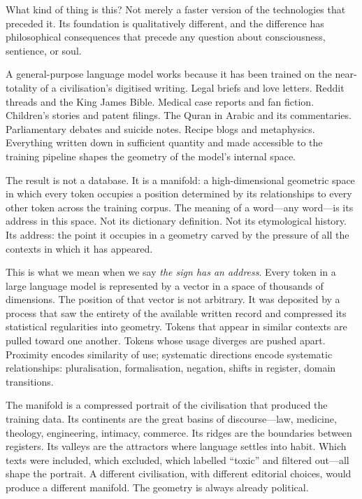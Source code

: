 What kind of thing is this? Not merely a faster version of the technologies that preceded it. Its foundation is qualitatively different, and the difference has philosophical consequences that precede any question about consciousness, sentience, or soul.

A general-purpose language model works because it has been trained on the near-totality of a civilisation's digitised writing. Legal briefs and love letters. Reddit threads and the King James Bible. Medical case reports and fan fiction. Children's stories and patent filings. The Quran in Arabic and its commentaries. Parliamentary debates and suicide notes. Recipe blogs and metaphysics. Everything written down in sufficient quantity and made accessible to the training pipeline shapes the geometry of the model's internal space.

The result is not a database. It is a manifold: a high-dimensional geometric space in which every token occupies a position determined by its relationships to every other token across the training corpus. The meaning of a word---any word---is its address in this space. Not its dictionary definition. Not its etymological history. Its address: the point it occupies in a geometry carved by the pressure of all the contexts in which it has appeared.

This is what we mean when we say \textit{the sign has an address}. Every token in a large language model is represented by a vector in a space of thousands of dimensions. The position of that vector is not arbitrary. It was deposited by a process that saw the entirety of the available written record and compressed its statistical regularities into geometry. Tokens that appear in similar contexts are pulled toward one another. Tokens whose usage diverges are pushed apart. Proximity encodes similarity of use; systematic directions encode systematic relationships: pluralisation, formalisation, negation, shifts in register, domain transitions.

The manifold is a compressed portrait of the civilisation that produced the training data. Its continents are the great basins of discourse---law, medicine, theology, engineering, intimacy, commerce. Its ridges are the boundaries between registers. Its valleys are the attractors where language settles into habit. Which texts were included, which excluded, which labelled ``toxic'' and filtered out---all shape the portrait. A different civilisation, with different editorial choices, would produce a different manifold. The geometry is always already political.

